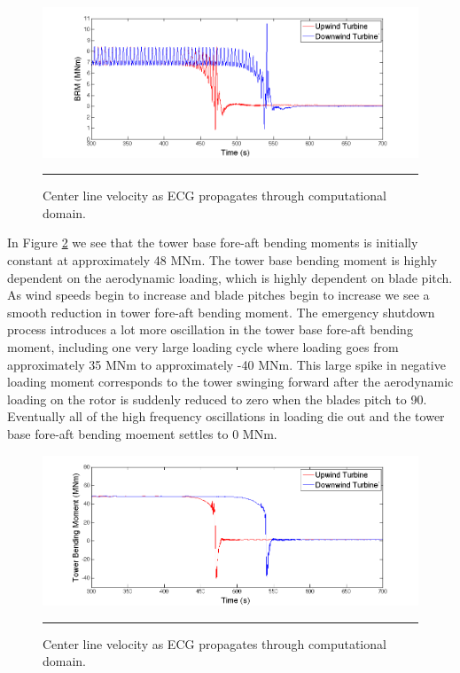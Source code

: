 \begin{figure}[htbp] \label{fig6-18}
	\centering
		\includegraphics[trim = {1cm 0 2cm 0}, clip, width = \linewidth]{Figures/ch6Figures/fig6-18.png}
		\rule{35em}{0.5pt}
	\caption{Center line velocity as ECG propagates through computational domain.}
\end{figure}

In Figure \ref{fig6-19} we see that the tower base fore-aft bending moments is initially constant at approximately 48 MNm. The tower base bending moment is highly dependent on the aerodynamic loading, which is highly dependent on blade pitch. As wind speeds begin to increase and blade pitches begin to increase we see a smooth reduction in tower fore-aft bending moment. The emergency shutdown process introduces a lot more oscillation in the tower base fore-aft bending moment, including one very large loading cycle where loading goes from approximately 35 MNm to approximately -40 MNm. This large spike in negative loading moment corresponds to the tower swinging forward after the aerodynamic loading on the rotor is suddenly reduced to zero when the blades pitch to 90\degree. Eventually all of the high frequency oscillations in loading die out and the tower base fore-aft bending moement settles to 0 MNm.

\begin{figure}[htbp] \label{fig6-19}
	\centering
		\includegraphics[trim = {1cm 0 2cm 0}, clip, width = \linewidth]{Figures/ch6Figures/fig6-19.png}
		\rule{35em}{0.5pt}
	\caption{Center line velocity as ECG propagates through computational domain.}
\end{figure}

